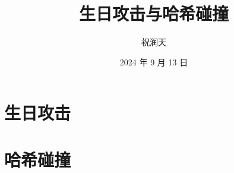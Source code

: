 \documentclass{beamer}
\title{生日攻击与哈希碰撞}
\author{祝润天}
\institute{复旦大学计算机科学技术学院}
\date{2024 年 9 月 13 日}
\begin{document}
\begin{frame}
    
    \maketitle

\end{frame}

\section{生日攻击}

\section{哈希碰撞}

\begin{frame}
    \frametitle{}

    

\end{frame}
\end{document}
